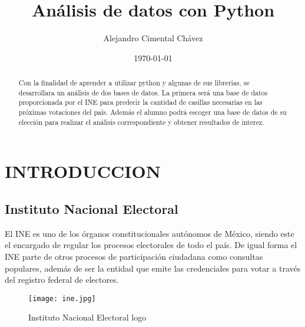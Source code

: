 \documentclass[%
 reprint,
 amsmath,amssymb,
 aps,
]{revtex4-2}
\begin{document}

\title{Análisis de datos con Python}%



\author{Alejandro Cimental Chávez}




\date{\today}%


\begin{abstract}
     Con la finalidad de aprender a utilizar python y algunas de sus librerias, se desarrollara un análisis  de dos bases de datos. La primera será una base de datos proporcionada por el INE para predecir la cantidad de casillas necesarias en las próximas votaciones del país. Además el alumno podrá escoger una base de datos de su elección para realizar el análisis correspondiente y obtener resultados de interez.
\end{abstract}


\maketitle

\section{INTRODUCCION}

\subsection{Instituto Nacional Electoral}

El INE es uno de los órganos constitucionales autónomos de México, siendo este el encargado de regular los procesos electorales de todo el país.
De igual forma el INE parte de otros procesos de participación ciudadana como consultas populares, además de ser la entidad que emite las credenciales para votar a través del registro federal de electores.\cite{wiki}
\begin{figure}[h]
    \centering
    \texttt{[image: ine.jpg]}
    \caption{Instituto Nacional Electoral logo}
    \label{fig:my_label}
\end{figure}
\end{document}
